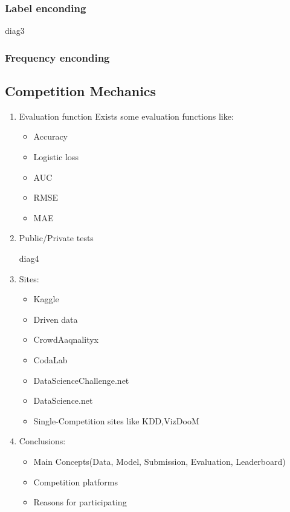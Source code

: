 \documentclass[a4paper,12pt]{book}
\begin{document}
        \subsubsection{Label enconding}
            {diag3}
        \subsubsection{Frequency enconding}



    \subsection{Competition Mechanics}

    \begin{enumerate}
        \item Evaluation function
            Exists some evaluation functions like:
            \begin{itemize}
                \item Accuracy
                \item Logistic loss
                \item AUC
                \item RMSE
                \item MAE
            \end{itemize}
        \item Public/Private tests
        
            {diag4}

        \item Sites:
            \begin{itemize}
                \item Kaggle
                \item Driven data
                \item CrowdAaqnalityx
                \item CodaLab
                \item DataScienceChallenge.net
                \item DataScience.net
                \item Single-Competition sites like KDD,VizDooM
            \end{itemize}
        \item Conclusions:
            \begin{itemize}
                \item Main Concepts(Data, Model, Submission, Evaluation, Leaderboard)
                \item Competition platforms
                \item Reasons for participating
            \end{itemize}
        
    \end{enumerate}
    
\end{document}
